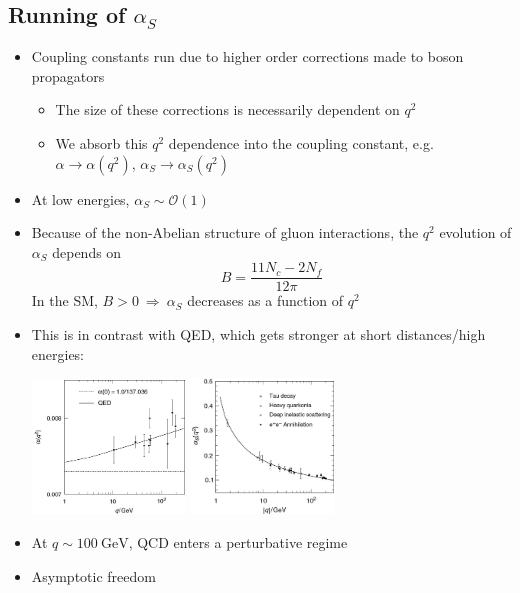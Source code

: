\documentclass[11pt]{article}
\newcommand{\gev}{\text{GeV}}
\newcommand{\ord}[1]{\ensuremath{\mathcal{O}(#1)}}
\newcommand{\thus}{\ensuremath{~\Rightarrow~}}
\begin{document}
\subsection{Running of $\alpha_S$}
\begin{itemize}
  \item Coupling constants run due to higher order corrections made to boson propagators
  \begin{itemize}
    \item The size of these corrections is necessarily dependent on $q^2$
    \item We absorb this $q^2$ dependence into the coupling constant, e.g. $\alpha\rightarrow\alpha(q^2)$, $\alpha_S\rightarrow \alpha_S(q^2)$
  \end{itemize}
  \item At low energies, $\alpha_S \sim \ord1$
  \item Because of the non-Abelian structure of gluon interactions, the $q^2$ evolution of $\alpha_S$ depends on 
  \begin{equation}
    B = \frac{11N_c-2N_f}{12\pi}
  \end{equation}
  In the SM, $B>0$\thus $\alpha_S$ decreases as a function of $q^2$
  \item This is in contrast with QED, which gets stronger at short distances/high energies:
  \begin{center}
    \includegraphics[width=0.32\textwidth]{figs/alpharun.png}\hspace{5mm}
    \includegraphics[width=0.3\textwidth]{figs/alphaSrun.png}
  \end{center}
  \item At $q\sim 100~\gev$, QCD enters a perturbative regime
  \item Asymptotic freedom

\end{itemize}
\end{document}
